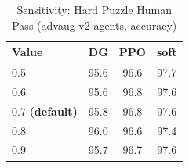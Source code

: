 \begin{table}[h]
\centering
\caption{Sensitivity: Hard Puzzle Human Pass (advaug v2 agents, accuracy)}
\label{tab:sensitivity_hard_puzzle_human_pass}
\begin{tabular}{lccc}
\toprule
Value & DG & PPO & soft \\
\midrule
  0.5 & 95.6 & 96.6 & 97.7 \\
  0.6 & 95.6 & 96.8 & 97.6 \\
  0.7 \textbf{(default)} & 95.8 & 96.8 & 97.6 \\
  0.8 & 96.0 & 96.6 & 97.4 \\
  0.9 & 95.7 & 96.7 & 97.6 \\
\bottomrule
\end{tabular}
\end{table}